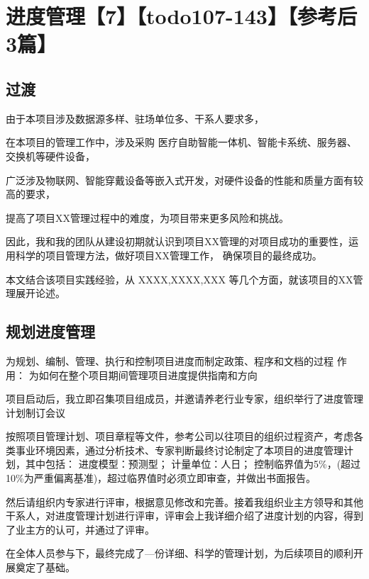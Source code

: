 \documentclass[UTF8]{../computerUniverse}
\begin{document}
\chapter{进度管理【7】【todo107-143】【参考后3篇】}



\section{过渡}

由于本项目涉及数据源多样、驻场单位多、干系人要求多，

在本项目的管理工作中，涉及采购
医疗自助智能一体机、智能卡系统、服务器、交换机等硬件设备，

广泛涉及物联网、智能穿戴设备等嵌入式开发，对硬件设备的性能和质量方面有较高的要求，

提高了项目XX管理过程中的难度，为项目带来更多风险和挑战。

因此，我和我的团队从建设初期就认识到项目XX管理的对项目成功的重要性，运用科学的项目管理方法，做好项目XX管理工作，
确保项目的最终成功。

本文结合该项目实践经验，从
XXXX,XXXX,XXX
等几个方面，就该项目的XX管理展开论述。



\section{规划进度管理}

为规划、编制、管理、执行和控制项目进度而制定政策、程序和文档的过程
作用：
为如何在整个项目期间管理项目进度提供指南和方向


项目启动后，我立即召集项目组成员，并邀请养老行业专家，组织举行了进度管理计划制订会议

按照项目管理计划、项目章程等文件，参考公司以往项目的组织过程资产，考虑各类事业环境因素，通过分析技术、专家判断最终讨论制定了本项目的进度管理计划，其中包括：
进度模型：预测型；
计量单位：人日；
控制临界值为5\%，(超过10\%为严重偏离基准)，超过临界值时必须立即审查，并做出书面报告。

然后请组织内专家进行评审，根据意见修改和完善。接着我组织业主方领导和其他干系人，对进度管理计划进行评审，评审会上我详细介绍了进度计划的内容，得到了业主方的认可，并通过了评审。

在全体人员参与下，最终完成了—份详细、科学的管理计划，为后续项目的顺利开展奠定了基础。
\end{document}
